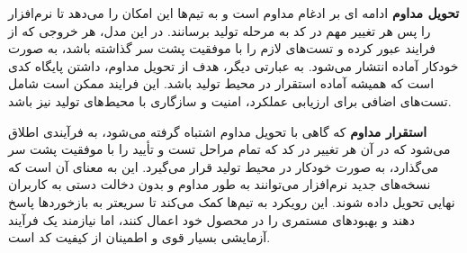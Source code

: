 \textbf{تحویل مداوم}
 ادامه ای بر ادغام مداوم است و به تیم‌ها این امکان را می‌دهد تا نرم‌افزار را پس هر تغییر مهم در کد به مرحله تولید برسانند. در این مدل، هر خروجی که از فرایند  عبور کرده و تست‌های لازم را با موفقیت پشت سر گذاشته باشد، به صورت خودکار آماده انتشار می‌شود. به عبارتی دیگر، هدف از تحویل مداوم، داشتن پایگاه کدی است که همیشه آماده استقرار در محیط تولید باشد. این فرایند ممکن است شامل تست‌های اضافی برای ارزیابی عملکرد، امنیت و سازگاری با محیط‌های تولید نیز باشد. 

\textbf{استقرار مداوم}
 که گاهی با تحویل مداوم اشتباه گرفته می‌شود، به فرآیندی اطلاق می‌شود که در آن هر تغییر در کد که تمام مراحل تست و تأیید را با موفقیت پشت سر می‌گذارد، به صورت خودکار در محیط تولید قرار می‌گیرد. این به معنای آن است که نسخه‌های جدید نرم‌افزار می‌توانند به طور مداوم و بدون دخالت دستی به کاربران نهایی تحویل داده شوند. این رویکرد به تیم‌ها کمک می‌کند تا سریعتر به بازخوردها پاسخ دهند و بهبودهای مستمری را در محصول خود اعمال کنند، اما نیازمند یک فرآیند آزمایشی بسیار قوی و اطمینان از کیفیت کد است.


